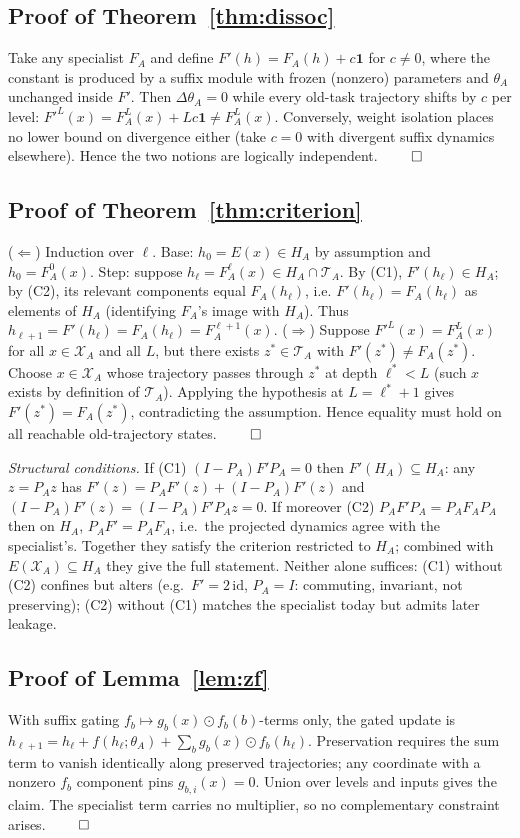 \documentclass[11pt]{article}
\theoremstyle{definition}\newtheorem{definition}{Definition}
\theoremstyle{remark}\newtheorem{remark}{Remark}
\newcommand{\Xa}{\mathcal{X}_A}
\newcommand{\TA}{\mathcal{T}_A}
\begin{document}
\subsection{Proof of Theorem~\ref{thm:dissoc}}
Take any specialist $F_A$ and define $F'(h)=F_A(h)+c\mathbf{1}$ for $c\neq0$, where the
constant is produced by a suffix module with frozen (nonzero) parameters and $\theta_A$
unchanged inside $F'$. Then $\Delta\theta_A=0$ while every old-task trajectory shifts by
$c$ per level: $F'^L(x)=F_A^L(x)+Lc\mathbf{1}\neq F_A^L(x)$. Conversely, weight isolation
places no lower bound on divergence either (take $c=0$ with divergent suffix dynamics
elsewhere). Hence the two notions are logically independent. \hfill$\qed$

\subsection{Proof of Theorem~\ref{thm:criterion}}
($\Leftarrow$) Induction over $\ell$. Base: $h_0=E(x)\in H_A$ by assumption and
$h_0=F_A^0(x)$. Step: suppose $h_\ell=F_A^\ell(x)\in H_A\cap\TA$. By (C1),
$F'(h_\ell)\in H_A$; by (C2), its relevant components equal $F_A(h_\ell)$, i.e.
$F'(h_\ell)=F_A(h_\ell)$ as elements of $H_A$ (identifying $F_A$'s image with $H_A$).
Thus $h_{\ell+1}=F'(h_\ell)=F_A(h_\ell)=F_A^{\ell+1}(x)$.
($\Rightarrow$) Suppose $F'^L(x)=F_A^L(x)$ for all $x\in\Xa$ and all $L$, but there exists
$z^*\in\TA$ with $F'(z^*)\neq F_A(z^*)$. Choose $x\in\Xa$ whose trajectory passes through
$z^*$ at depth $\ell^*<L$ (such $x$ exists by definition of $\TA$). Applying the hypothesis
at $L=\ell^*+1$ gives $F'(z^*)=F_A(z^*)$, contradicting the assumption. Hence equality must
hold on all reachable old-trajectory states. \hfill$\qed$

\emph{Structural conditions.} If (C1) $(I-P_A)F'P_A=0$ then $F'(H_A)\subseteq H_A$: any
$z=P_Az$ has $F'(z)=P_AF'(z)+(I-P_A)F'(z)$ and $(I-P_A)F'(z)=(I-P_A)F'P_Az=0$. If moreover
(C2) $P_AF'P_A=P_AF_AP_A$ then on $H_A$, $P_AF'=P_AF_A$, i.e.\ the projected dynamics agree
with the specialist's. Together they satisfy the criterion restricted to $H_A$; combined
with $E(\Xa)\subseteq H_A$ they give the full statement. Neither alone suffices: (C1)
without (C2) confines but alters (e.g.\ $F'=2\,\mathrm{id}$, $P_A=I$: commuting, invariant,
not preserving); (C2) without (C1) matches the specialist today but admits later leakage.

\subsection{Proof of Lemma~\ref{lem:zf}}
With suffix gating $f_b\mapsto g_b(x)\odot f_b(b)$-terms only, the gated update is
$h_{\ell+1}=h_\ell+f(h_\ell;\theta_A)+\sum_b g_b(x)\odot f_b(h_\ell)$. Preservation
requires the sum term to vanish identically along preserved trajectories; any coordinate
with a nonzero $f_b$ component pins $g_{b,i}(x)=0$. Union over levels and inputs gives the
claim. The specialist term carries no multiplier, so no complementary constraint arises.
\hfill$\qed$
\end{document}
